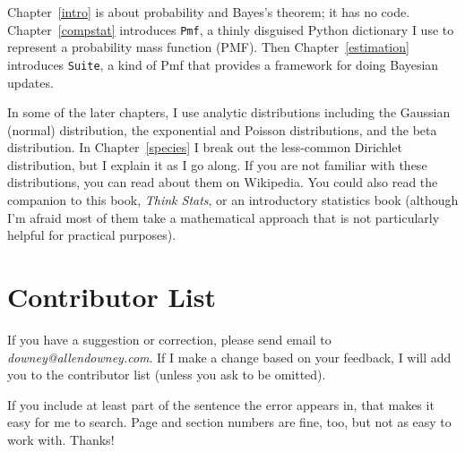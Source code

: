 \documentclass[12pt]{book}
\theoremstyle{exercise}
\newcommand{\py}[1]{{\tt #1}}%
\begin{document}
Chapter~\ref{intro} is about probability and Bayes's theorem; it has
no code.  Chapter~\ref{compstat} introduces \py{Pmf}, a thinly disguised
Python dictionary I use to represent a probability mass function
(PMF).  Then Chapter~\ref{estimation} introduces \py{Suite}, a kind
of Pmf that provides a framework for doing Bayesian updates.

In some of the later chapters, I use
analytic distributions including the Gaussian (normal) distribution,
the exponential and Poisson distributions, and the beta distribution.
In Chapter~\ref{species} I break out the less-common Dirichlet
distribution, but I explain it as I go along.  If you are not familiar
with these distributions, you can read about them on Wikipedia.  You
could also read the companion to this book, {\it Think Stats}, or an
introductory statistics book (although I'm afraid most of them take
a mathematical approach that is not particularly helpful for practical
purposes).



\section*{Contributor List}

If you have a suggestion or correction, please send email to
{\it downey@allendowney.com}.  If I make a change based on your
feedback, I will add you to the contributor list
(unless you ask to be omitted).

If you include at least part of the sentence the
error appears in, that makes it easy for me to search.  Page and
section numbers are fine, too, but not as easy to work with.
Thanks!

\small
\end{document}
